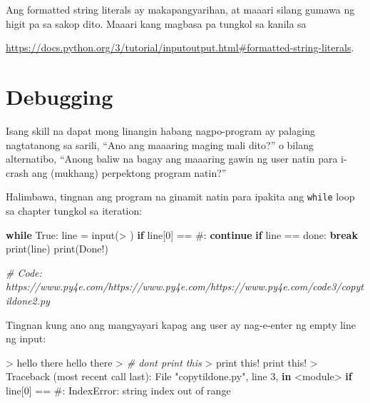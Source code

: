 \documentclass[10pt,]{book}
\newenvironment{Shaded}{}{}
\newcommand{\BuiltInTok}[1]{\textcolor[rgb]{0.00,0.50,0.00}{#1}}
\newcommand{\CommentTok}[1]{\textcolor[rgb]{0.38,0.63,0.69}{\textit{#1}}}
\newcommand{\ControlFlowTok}[1]{\textcolor[rgb]{0.00,0.44,0.13}{\textbf{#1}}}
\newcommand{\DecValTok}[1]{\textcolor[rgb]{0.25,0.63,0.44}{#1}}
\newcommand{\KeywordTok}[1]{\textcolor[rgb]{0.00,0.44,0.13}{\textbf{#1}}}
\newcommand{\NormalTok}[1]{#1}
\newcommand{\OperatorTok}[1]{\textcolor[rgb]{0.40,0.40,0.40}{#1}}
\newcommand{\PreprocessorTok}[1]{\textcolor[rgb]{0.74,0.48,0.00}{#1}}
\newcommand{\StringTok}[1]{\textcolor[rgb]{0.25,0.44,0.63}{#1}}
\newcommand{\VariableTok}[1]{\textcolor[rgb]{0.10,0.09,0.49}{#1}}
\begin{document}
Ang formatted string literals ay makapangyarihan, at maaari silang
gumawa ng higit pa sa sakop dito. Maaari kang magbasa pa tungkol sa
kanila sa

\url{https://docs.python.org/3/tutorial/inputoutput.html\#formatted-string-literals}.

\section{Debugging}\label{debugging-5}


Isang skill na dapat mong linangin habang nagpo-program ay palaging
nagtatanong sa sarili, ``Ano ang maaaring maging mali dito?'' o bilang
alternatibo, ``Anong baliw na bagay ang maaaring gawin ng user natin
para i-crash ang (mukhang) perpektong program natin?''

Halimbawa, tingnan ang program na ginamit natin para ipakita ang
\texttt{while} loop sa chapter tungkol sa iteration:

\begin{Shaded}
\begin{Highlighting}[]
\ControlFlowTok{while} \VariableTok{True}\NormalTok{:}
\NormalTok{    line }\OperatorTok{=} \BuiltInTok{input}\NormalTok{(}\StringTok{\textquotesingle{}\textgreater{} \textquotesingle{}}\NormalTok{)}
    \ControlFlowTok{if}\NormalTok{ line[}\DecValTok{0}\NormalTok{] }\OperatorTok{==} \StringTok{\textquotesingle{}\#\textquotesingle{}}\NormalTok{:}
        \ControlFlowTok{continue}
    \ControlFlowTok{if}\NormalTok{ line }\OperatorTok{==} \StringTok{\textquotesingle{}done\textquotesingle{}}\NormalTok{:}
        \ControlFlowTok{break}
    \BuiltInTok{print}\NormalTok{(line)}
\BuiltInTok{print}\NormalTok{(}\StringTok{\textquotesingle{}Done!\textquotesingle{}}\NormalTok{)}

\CommentTok{\# Code: https://www.py4e.com/https://www.py4e.com/https://www.py4e.com/code3/copytildone2.py}
\end{Highlighting}
\end{Shaded}

Tingnan kung ano ang mangyayari kapag ang user ay nag-e-enter ng empty
line ng input:

\begin{Shaded}
\begin{Highlighting}[]
\OperatorTok{\textgreater{}}\NormalTok{ hello there}
\NormalTok{hello there}
\OperatorTok{\textgreater{}} \CommentTok{\# don\textquotesingle{}t print this}
\OperatorTok{\textgreater{}} \BuiltInTok{print}\NormalTok{ this}\OperatorTok{!}
\BuiltInTok{print}\NormalTok{ this}\OperatorTok{!}
\OperatorTok{\textgreater{}}
\NormalTok{Traceback (most recent call last):}
\NormalTok{  File }\StringTok{"copytildone.py"}\NormalTok{, line }\DecValTok{3}\NormalTok{, }\KeywordTok{in} \OperatorTok{\textless{}}\NormalTok{module}\OperatorTok{\textgreater{}}
    \ControlFlowTok{if}\NormalTok{ line[}\DecValTok{0}\NormalTok{] }\OperatorTok{==} \StringTok{\textquotesingle{}\#\textquotesingle{}}\NormalTok{:}
\PreprocessorTok{IndexError}\NormalTok{: string index out of }\BuiltInTok{range}
\end{Highlighting}
\end{Shaded}
\end{document}
